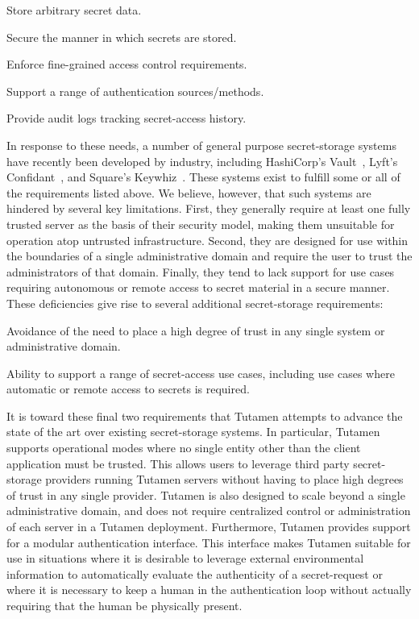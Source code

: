 \begin{packed_item}
\item Store arbitrary secret data.
\item Secure the manner in which secrets are stored.
\item Enforce fine-grained access control requirements.
\item Support a range of authentication sources/methods.
\item Provide audit logs tracking secret-access history.
\end{packed_item}

In response to these needs, a number of general purpose secret-storage
systems have recently been developed by industry, including
HashiCorp's Vault~\cite{vault}, Lyft's Confidant~\cite{confidant}, and
Square's Keywhiz~\cite{keywhiz}. These systems exist to fulfill some
or all of the requirements listed above. We believe, however, that
such systems are hindered by several key limitations. First, they
generally require at least one fully trusted server as the basis of
their security model, making them unsuitable for operation atop
untrusted infrastructure. Second, they are designed for use within the
boundaries of a single administrative domain and require the user to
trust the administrators of that domain. Finally, they tend to lack
support for use cases requiring autonomous or remote access to secret
material in a secure manner. These deficiencies give rise to several
additional secret-storage requirements:

\begin{packed_item}
\item Avoidance of the need to place a high degree of trust in any
  single system or administrative domain.
\item Ability to support a range of secret-access use cases, including
  use cases where automatic or remote access to secrets is required.
\end{packed_item}

It is toward these final two requirements that Tutamen attempts to
advance the state of the art over existing secret-storage systems. In
particular, Tutamen supports operational modes where no single entity
other than the client application must be trusted. This allows users
to leverage third party secret-storage providers running Tutamen
servers without having to place high degrees of trust in any single
provider. Tutamen is also designed to scale beyond a single
administrative domain, and does not require centralized control or
administration of each server in a Tutamen deployment. Furthermore,
Tutamen provides support for a modular authentication interface. This
interface makes Tutamen suitable for use in situations where it is
desirable to leverage external environmental information to
automatically evaluate the authenticity of a secret-request or where
it is necessary to keep a human in the authentication loop without
actually requiring that the human be physically present.

